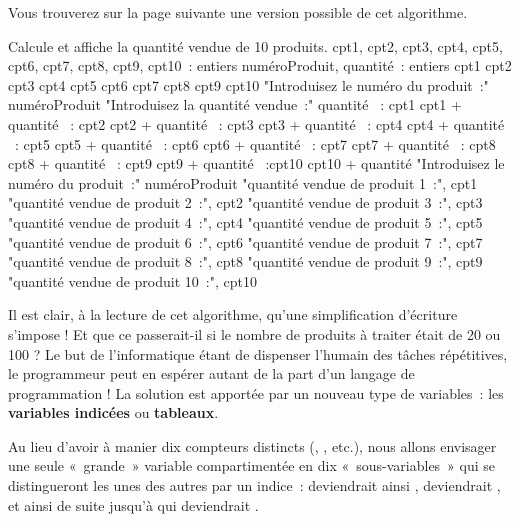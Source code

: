 	Vous trouverez sur la page suivante
	une version possible de cet algorithme.

	\begin{Pseudocode}
	\LComment Calcule et affiche la quantité vendue de 10 produits.
		\Empty
		\Decl cpt1, cpt2, cpt3, cpt4, cpt5, cpt6, cpt7, cpt8, cpt9, cpt10~: entiers
		\Decl numéroProduit, quantité~: entiers
		\Empty
		\Let cpt1 
		\Let cpt2 
		\Let cpt3 
		\Let cpt4 
		\Let cpt5 
		\Let cpt6 
		\Let cpt7 
		\Let cpt8 
		\Let cpt9 
		\Let cpt10 
		\Empty
		\Write "Introduisez le numéro du produit~:"
		\Read numéroProduit
		\Empty
		\Empty
			\Write "Introduisez la quantité vendue~:"
			\Read quantité
			\Empty
				~: cpt1 \Gets cpt1 + quantité
				~: cpt2 \Gets cpt2 + quantité
				~: cpt3 \Gets cpt3 + quantité
				~: cpt4 \Gets cpt4 + quantité
				~: cpt5 \Gets cpt5 + quantité
				~: cpt6 \Gets cpt6 + quantité
				~: cpt7 \Gets cpt7 + quantité
				~: cpt8 \Gets cpt8 + quantité
				~: cpt9 \Gets cpt9 + quantité
				~:cpt10 \Gets cpt10 + quantité
			\EndSwitch
			\Empty
			\Write "Introduisez le numéro du produit~:"
			\Read numéroProduit
			\Empty
		\EndWhile
		\Empty
		\Write "quantité vendue de produit 1~:", cpt1
		\Write "quantité vendue de produit 2~:", cpt2
		\Write "quantité vendue de produit 3~:", cpt3
		\Write "quantité vendue de produit 4~:", cpt4
		\Write "quantité vendue de produit 5~:", cpt5
		\Write "quantité vendue de produit 6~:", cpt6
		\Write "quantité vendue de produit 7~:", cpt7
		\Write "quantité vendue de produit 8~:", cpt8
		\Write "quantité vendue de produit 9~:", cpt9
		\Write "quantité vendue de produit 10~:", cpt10
		\Empty
	\EndModule
	\end{Pseudocode}

	Il est clair, à la lecture de cet algorithme, qu’une simplification
	d’écriture s’impose ! Et que ce passerait-il si le nombre de produits à
	traiter était de 20 ou 100 ? Le but de l’informatique étant de
	dispenser l’humain des tâches répétitives, le programmeur peut en
	espérer autant de la part d’un langage de programmation ! La solution
	est apportée par un nouveau type de variables~: les \textbf{variables
	indicées} ou \textbf{tableaux}.

	Au lieu d’avoir à manier dix compteurs distincts
	(, , etc.), nous allons
	envisager une seule «~grande~» variable  
	compartimentée en dix «~sous-variables~» qui se distingueront 
	les unes des autres par un indice~:  
	deviendrait ainsi ,  
	deviendrait	, et ainsi de suite jusqu’à
	 qui deviendrait .


